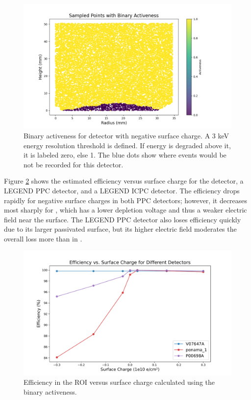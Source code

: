 \begin{figure}%
\centering
\includegraphics[trim={1.5cm 0cm 6cm 1.77cm},clip,width=0.9\linewidth]{ch5/figs/bianry_act_ponama_1_-0.03.png}
\caption{Binary activeness for {\ponama} detector with negative surface charge. A $3$ keV energy resolution threshold is defined. If energy is degraded above it, it is labeled zero, else 1. The blue dots show where {\onbb} events would be not be recorded for this detector.}
\label{ch5_fig_binary_activenss}
\end{figure}

Figure \ref{fig:efficiency_sc_plot} shows the estimated efficiency versus surface charge for the {\ponama} detector, a LEGEND PPC detector, and a LEGEND ICPC detector. The efficiency drops rapidly for negative surface charges in both PPC detectors; however, it decreases most sharply for {\ponama}, which has a lower depletion voltage and thus a weaker electric field near the surface. The LEGEND PPC detector also loses efficiency quickly due to its larger passivated surface, but its higher electric field moderates the overall loss more than in {\ponama}.

\begin{figure}%
\centering
\includegraphics[trim={1.6cm 0.3cm 2cm 1.8cm},clip,width=\linewidth]{ch5/figs/efficiency_0nbb.pdf}
\caption{Efficiency in the ROI versus surface charge calculated using the binary activeness.}
\label{fig:efficiency_sc_plot}
\end{figure}

